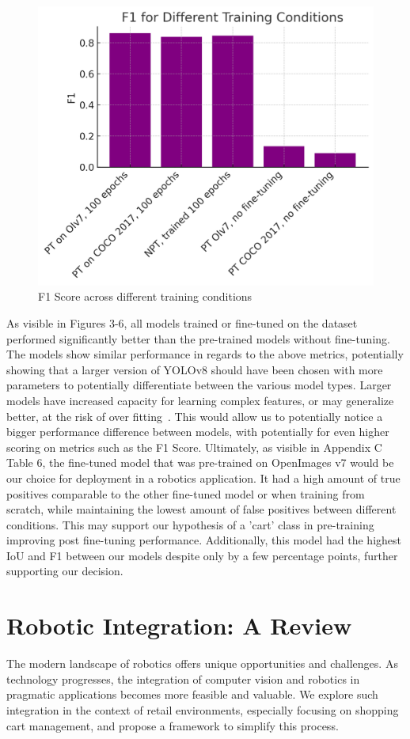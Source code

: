 \documentclass[10pt,twocolumn,letterpaper]{article}
\begin{document}
\begin{figure}[H]
    \centering
    \includegraphics[width=0.8\linewidth]{f1.png}
    \caption{F1 Score across different training conditions}
    \label{fig:f1}
\end{figure}

As visible in Figures 3-6, all models trained or fine-tuned on the dataset performed significantly better than the pre-trained models without fine-tuning. The models show similar performance in regards to the above metrics, potentially showing that a larger version of YOLOv8 should have been chosen with more parameters to potentially differentiate between the various model types. Larger models have increased capacity for learning complex features, or may generalize better, at the risk of over fitting~\cite{model_complexity}. This would allow us to potentially notice a bigger performance difference between models, with potentially for even higher scoring on metrics such as the F1 Score. Ultimately, as visible in Appendix C Table 6, the fine-tuned model that was pre-trained on OpenImages v7 would be our choice for deployment in a robotics application. It had a high amount of true positives comparable to the other fine-tuned model or when training from scratch, while maintaining the lowest amount of false positives between different conditions. This may support our hypothesis of a 'cart' class in pre-training improving post fine-tuning performance. Additionally, this model had the highest IoU and F1 between our models despite only by a few percentage points, further supporting our decision.

\section{Robotic Integration: A Review}
The modern landscape of robotics offers unique opportunities and challenges. As technology progresses, the integration of computer vision and robotics in pragmatic applications becomes more feasible and valuable. We explore such integration in the context of retail environments, especially focusing on shopping cart management, and propose a framework to simplify this process.
\end{document}
